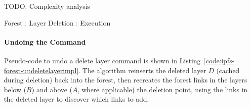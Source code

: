 TODO: Complexity analysis


\begin{stulisting}[p]
\caption{Forest : Layer Deletion : Execution}
\label{code:ipfs-forest-deletelayerimpl}

\end{stulisting}

\paragraph{Undoing the Command}

Pseudo-code to undo a delete layer command is shown in Listing~\ref{code:ipfs-forest-undeletelayerimpl}. The algorithm reinserts the deleted layer $D$ (cached during deletion) back into the forest, then recreates the forest links in the layers below ($B$) and above ($A$, where applicable) the deletion point, using the links in the deleted layer to discover which links to add.

